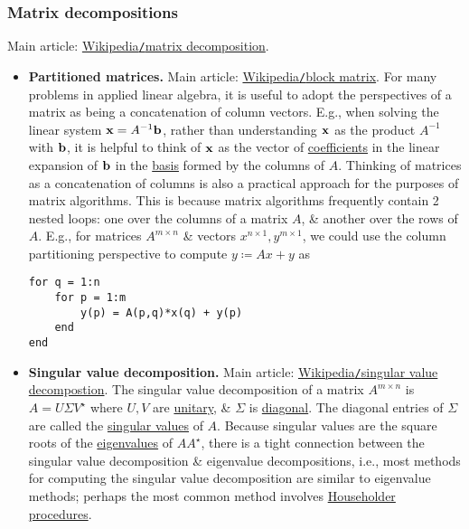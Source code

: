 \documentclass{article}
\begin{document}
\subsubsection{Matrix decompositions}
Main article: \href{https://en.wikipedia.org/wiki/Matrix_decomposition}{Wikipedia{\tt/}matrix decomposition}.
\begin{itemize}
	\item {\bf Partitioned matrices.} Main article: \href{https://en.wikipedia.org/wiki/Block_matrix}{Wikipedia{\tt/}block matrix}. For many problems in applied linear algebra, it is useful to adopt the perspectives of a matrix as being a concatenation of column vectors. E.g., when solving the linear system ${\bf x} = A^{-1}{\bf b}$, rather than understanding ${\bf x}$ as the product $A^{-1}$ with ${\bf b}$, it is helpful to think of ${\bf x}$ as the vector of \href{https://en.wikipedia.org/wiki/Coefficient}{coefficients} in the linear expansion of ${\bf b}$ in the \href{https://en.wikipedia.org/wiki/Basis_(linear_algebra)}{basis} formed by the columns of $A$. Thinking of matrices as a concatenation of columns is also a practical approach for the purposes of matrix algorithms. This is because matrix algorithms frequently contain 2 nested loops: one over the columns of a matrix $A$, \& another over the rows of $A$. E.g., for matrices $A^{m\times n}$ \& vectors $x^{n\times1},y^{m\times1}$, we could use the column partitioning perspective to compute $y\coloneqq Ax + y$ as
	\begin{verbatim}
for q = 1:n
    for p = 1:m
        y(p) = A(p,q)*x(q) + y(p)
    end
end
	\end{verbatim}
	\item {\bf Singular value decomposition.} Main article: \href{https://en.wikipedia.org/wiki/Singular_value_decomposition}{Wikipedia{\tt/}singular value decompostion}. The singular value decomposition of a matrix $A^{m\times n}$ is $A = U\Sigma V^\star$ where $U,V$ are \href{https://en.wikipedia.org/wiki/Unitary_matrix}{unitary}, \& $\Sigma$ is \href{https://en.wikipedia.org/wiki/Diagonal_matrix}{diagonal}. The diagonal entries of $\Sigma$ are called the \href{https://en.wikipedia.org/wiki/Singular_values}{singular values} of $A$. Because singular values are the square roots of the \href{https://en.wikipedia.org/wiki/Eigenvalues}{eigenvalues} of $AA^\star$, there is a tight connection between the singular value decomposition \& eigenvalue decompositions, i.e., most methods for computing the singular value decomposition are similar to eigenvalue methods; perhaps the most common method involves \href{https://en.wikipedia.org/wiki/Householder_transformation}{Householder procedures}.

\end{itemize}
\end{document}
